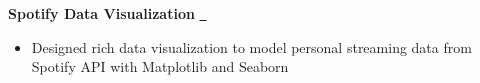\textbf{Spotify Data Visualization} \href{https://ininicho.com/stories/spotify-unwrapped}{\github\ } \par
\begin{itemize}
	\item Designed rich data visualization to model personal streaming data from Spotify API with Matplotlib and Seaborn
\end{itemize}
\vspace{0.1cm} \par

